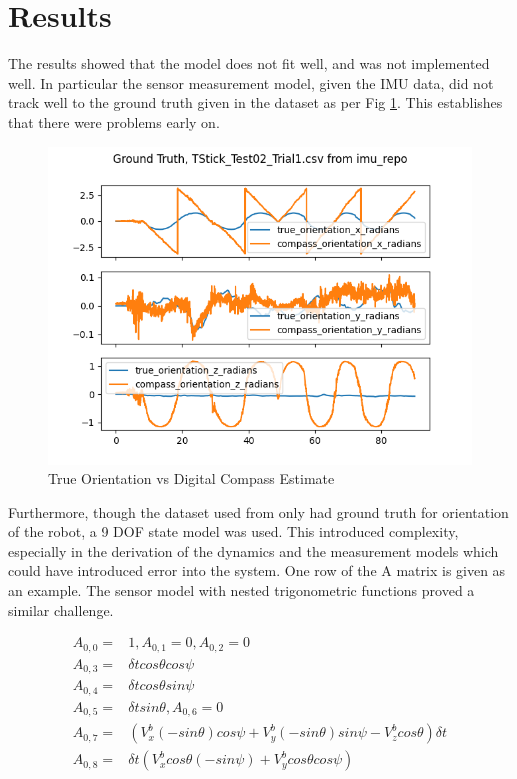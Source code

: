 \documentclass[conference]{IEEEtran}
\begin{document}
\section{Results}

The results showed that the model does not fit well, and was not implemented well. In particular the sensor measurement model, given the IMU data, did not track well to the ground truth given in the dataset as per Fig \ref{fig:true_orientation}.  This establishes that there were problems early on.
\begin{figure}[h!]
  \includegraphics[width=\columnwidth]{true_values_vs_measurements.png}
  \caption{True Orientation vs Digital Compass Estimate}
  \label{fig:true_orientation}
\end{figure}

Furthermore, though the dataset used from \cite{b20} only had ground truth for orientation of the robot, a 9 DOF state model was used. This introduced complexity, especially in the derivation of the dynamics and the measurement models which could have introduced error into the system.  One row of the A matrix is given as an example. The sensor model with nested trigonometric functions proved a similar challenge.

\begin{align*}
A_{0,0} =& 1, A_{0,1} = 0, A_{0,2} = 0\\
A_{0,3} =& \delta t cos \theta cos \psi \\
A_{0,4} =& \delta t cos \theta sin \psi \\
A_{0,5} =&  \delta t sin \theta, A_{0,6} =  0 \\
A_{0,7} =& (V_x^b (-sin \theta) cos \psi + V_y^b (-sin \theta) sin \psi - V_z^b cos \theta) \delta t \\
A_{0,8} =& \delta t (V_x^b cos \theta (-sin \psi ) + V_y^b cos \theta cos \psi)\\
\end{align*}
\end{document}
